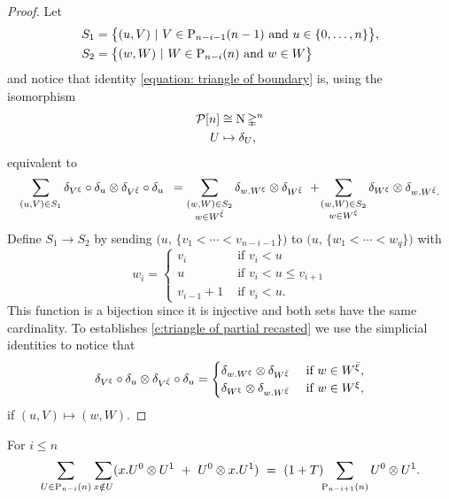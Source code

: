 \begin{proof}
	Let
	\begin{align*}
	& S_1 = \big\{ (u, V)\ |\ V \in \P_{n-i-1}(n-1) \text{ and }  u \in \{0, \dots, n \} \big\}, \\
	& S_2 = \big\{ (w, W)\ |\ W \in \P_{n-i}(n) \text{ and } w \in W \big\}
	\end{align*}
	and notice that identity \eqref{equation: triangle of boundary} is, using the isomorphism
	\begin{align*}
	\cP[n] &\cong \chains \simplex^n \\
	U &\mapsto \delta_U ,
	\end{align*}
	equivalent to
	\begin{equation} \label{e:triangle of partial recasted}
	\sum_{(u, V) \in S_1}
	\delta_{V^\xi} \circ \delta_u \ot \delta_{V^{\bar{\xi}}} \circ \delta_u \ \, =
	\sum_{\substack{(w, W) \in S_2 \\ w \in W^{\bar{\xi}}}}
	\delta_{w.W^\xi} \ot \delta_{W^{\bar{\xi}}} \ + \!
	\sum_{\substack{(w, W) \in S_2 \\ w \in W^\xi}}
	\delta_{W^\xi} \ot \delta_{w.W^{\bar{\xi}}.}
	\end{equation}
	Define $S_1 \to S_2$ by sending $\big(u, \, \{v_1 < \cdots < v_{n-i-1}\} \big)$ to $\big(u,\, \{w_1 < \cdots < w_{q}\} \big)$ with
	\[
	w_i =
	\begin{cases}
	v_i & \text{ if } v_i < u \\
	u & \text{ if } v_i < u \leq v_{i+1} \\
	v_{i-1}+1 & \text{ if } v_i < u.
	\end{cases}
	\]
	This function is a bijection since it is injective and both sets have the same cardinality.
	To establishes \eqref{e:triangle of partial recasted} we use the simplicial identities to notice that
	\[
	\delta_{V^\xi} \circ \delta_u \ot \delta_{V^{\bar{\xi}}} \circ \delta_u =
	\begin{cases}
	\delta_{w.W^\xi} \ot \delta_{W^{\bar{\xi}}} & \text{ if } w \in W^{\bar{\xi}}, \\
	\delta_{W^\xi} \ot \delta_{w.W^{\bar{\xi}}} & \text{ if } w \in W^\xi,
	\end{cases}
	\]
	if $(u, V) \mapsto (w, W)$.
\end{proof}

\begin{lemma} \label{lemma: boundary gives the lower case}
	For $i \leq n$
	\begin{equation} \label{lemma4: existence: eq1}
	\sum_{U \in \P_{n-i}(n)} \sum_{x \notin U} ({x.U^0} \ot {U^1}\ +\ {U^0} \ot {x.U^1})\ = \
	(1+T) \!\! \sum_{\P_{n-i+1}(n)} {U^0} \ot {U^1.}
	\end{equation}
\end{lemma}

